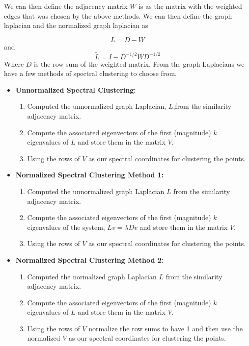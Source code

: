 \documentclass[12pt]{article}
\begin{document}
We can then define the adjacency matrix $W$ is as the matrix with the weighted edges that was chosen by the above methods. We can then define the graph laplacian and the normalized graph laplacian as 

\[ L = D -W\] and \[ \tilde{L} = I -D^{-1/2}WD^{-1/2}\] 
Where $D$ is the row sum of the weighted matrix. From the graph Laplacians we have a few methods of spectral clustering to choose from. 

\begin{itemize}
\item {\bf{ Unnormalized Spectral Clustering:}}
\begin{enumerate}
\item Computed the unnormalized graph Laplacian, $L$,from the similarity adjacency matrix.  
\item Compute the associated eigenvectors of the first (magnitude) $k$ eigenvalues of $L$ and store them in the matrix $V$. 
\item Using the rows of $V$  as our spectral coordinates for clustering the points. 
\end{enumerate}
 \item {\bf{ Normalized Spectral Clustering Method 1:}}
 \begin{enumerate}
\item Computed the unnormalized graph Laplacian $L$ from the similarity adjacency matrix.  
\item Compute the associated eigenvectors of the first (magnitude) $k$ eigenvalues of the system, $Lv = \lambda Dv$ and store them in the matrix $V$. 
\item Using the rows of $V$  as our spectral coordinates for clustering the points. 
\end{enumerate}

\item {\bf{ Normalized Spectral Clustering Method 2:}}
\begin{enumerate}
\item Computed the normalized graph Laplacian $L$ from the similarity adjacency matrix.  
\item Compute the associated eigenvectors of the first (magnitude) $k$ eigenvalues of $L$ and store them in the matrix $V$. 
\item Using the rows of $V$ normalize the row sums to have 1 and then use the normalized $V$ as our spectral  coordinates for clustering the points. 
\end{enumerate}

\end{itemize}
\end{document}
